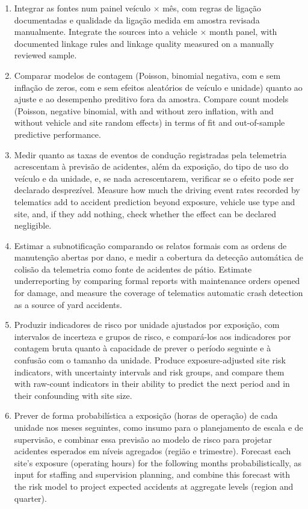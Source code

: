 \begin{enumerate}[label=(\alph*)]
  \item \tr%
    {Integrar as fontes num painel veículo $\times$ mês, com regras de ligação documentadas e qualidade da ligação medida em amostra revisada manualmente.}%
    {Integrate the sources into a vehicle $\times$ month panel, with documented linkage rules and linkage quality measured on a manually reviewed sample.}
  \item \tr%
    {Comparar modelos de contagem (Poisson, binomial negativa, com e sem inflação de zeros, com e sem efeitos aleatórios de veículo e unidade) quanto ao ajuste e ao desempenho preditivo fora da amostra.}%
    {Compare count models (Poisson, negative binomial, with and without zero inflation, with and without vehicle and site random effects) in terms of fit and out-of-sample predictive performance.}
  \item \tr%
    {Medir quanto as taxas de eventos de condução registradas pela telemetria acrescentam à previsão de acidentes, além da exposição, do tipo de uso do veículo e da unidade, e, se nada acrescentarem, verificar se o efeito pode ser declarado desprezível.}%
    {Measure how much the driving event rates recorded by telematics add to accident prediction beyond exposure, vehicle use type and site, and, if they add nothing, check whether the effect can be declared negligible.}
  \item \tr%
    {Estimar a subnotificação comparando os relatos formais com as ordens de manutenção abertas por dano, e medir a cobertura da detecção automática de colisão da telemetria como fonte de acidentes de pátio.}%
    {Estimate underreporting by comparing formal reports with maintenance orders opened for damage, and measure the coverage of telematics automatic crash detection as a source of yard accidents.}
  \item \tr%
    {Produzir indicadores de risco por unidade ajustados por exposição, com intervalos de incerteza e grupos de risco, e compará-los aos indicadores por contagem bruta quanto à capacidade de prever o período seguinte e à confusão com o tamanho da unidade.}%
    {Produce exposure-adjusted site risk indicators, with uncertainty intervals and risk groups, and compare them with raw-count indicators in their ability to predict the next period and in their confounding with site size.}
  \item \textit{} \tr%
    {Prever de forma probabilística a exposição (horas de operação) de cada unidade nos meses seguintes, como insumo para o planejamento de escala e de supervisão, e combinar essa previsão ao modelo de risco para projetar acidentes esperados em níveis agregados (região e trimestre).}%
    {Forecast each site's exposure (operating hours) for the following months probabilistically, as input for staffing and supervision planning, and combine this forecast with the risk model to project expected accidents at aggregate levels (region and quarter).}
\end{enumerate}

